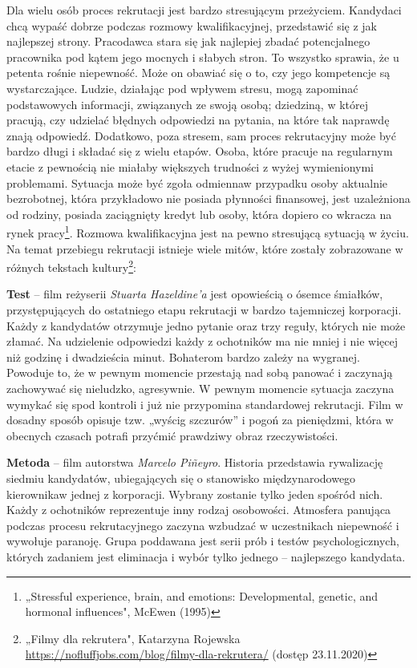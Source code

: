 \documentclass[twoside]{projektInzynierskiMS}
\numberwithin{figure}{section}
\begin{document}
Dla wielu osób proces rekrutacji jest bardzo stresującym przeżyciem. Kandydaci chcą wypaść dobrze podczas rozmowy kwalifikacyjnej, przedstawić się z jak najlepszej strony. Pracodawca stara się jak najlepiej zbadać potencjalnego pracownika pod kątem jego mocnych i słabych stron. To wszystko sprawia, że u petenta rośnie niepewność. Może on obawiać się o to, czy jego kompetencje są wystarczające. Ludzie, działając pod wpływem stresu, mogą zapominać podstawowych informacji, związanych ze swoją osobą; dziedziną, w której pracują, czy udzielać błędnych odpowiedzi na pytania, na które tak naprawdę znają odpowiedź. Dodatkowo, poza stresem, sam proces rekrutacyjny może być bardzo długi i składać się z wielu etapów. Osoba, które pracuje na regularnym etacie z pewnością nie miałaby większych trudności z wyżej wymienionymi problemami. Sytuacja może być zgoła odmienna\linebreak w przypadku osoby aktualnie bezrobotnej, która przykładowo nie posiada płynności finansowej, jest uzależniona od rodziny, posiada zaciągnięty kredyt lub osoby, która dopiero co wkracza na rynek pracy\footnote{„Stressful experience, brain, and emotions: Developmental, genetic, and hormonal influences", McEwen (1995)}. Rozmowa kwalifikacyjna jest na pewno stresującą sytuacją w życiu. Na temat przebiegu rekrutacji istnieje wiele mitów, które zostały zobrazowane w różnych tekstach kultury\footnote{„Filmy dla rekrutera", Katarzyna Rojewska \newline
\url{https://nofluffjobs.com/blog/filmy-dla-rekrutera/} (dostęp 23.11.2020)}:

\textbf{Test} – film reżyserii \textit{Stuarta Hazeldine'a} jest opowieścią o ósemce śmiałków, przystępujących do ostatniego etapu rekrutacji w bardzo tajemniczej korporacji. Każdy z kandydatów otrzymuje jedno pytanie oraz trzy reguły, których nie może złamać. Na udzielenie odpowiedzi każdy z ochotników ma nie mniej i nie więcej niż godzinę i dwadzieścia minut. Bohaterom bardzo zależy na wygranej. Powoduje to, że w pewnym momencie przestają nad sobą panować i zaczynają zachowywać się nieludzko, agresywnie. W pewnym momencie sytuacja zaczyna wymykać się spod kontroli i już nie przypomina standardowej rekrutacji. Film w dosadny sposób opisuje tzw. „wyścig szczurów” i pogoń za pieniędzmi, która w obecnych czasach potrafi przyćmić prawdziwy obraz rzeczywistości.

\textbf{Metoda} -- film autorstwa \textit{Marcelo Piñeyro}. Historia przedstawia rywalizację siedmiu kandydatów, ubiegających się o stanowisko międzynarodowego kierownika\linebreak w jednej z korporacji. Wybrany zostanie tylko jeden spośród nich. Każdy z ochotników reprezentuje inny rodzaj osobowości. Atmosfera panująca podczas procesu rekrutacyjnego zaczyna wzbudzać w uczestnikach niepewność i wywołuje paranoję. Grupa poddawana jest serii prób i testów psychologicznych, których zadaniem jest eliminacja i wybór tylko jednego – najlepszego kandydata.
\end{document}

